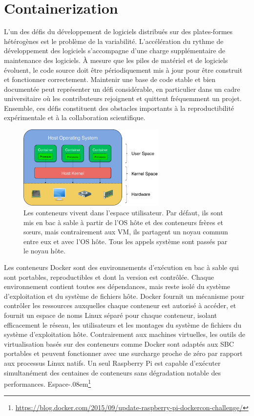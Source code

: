 \section{Containerization}\label{sec:containerization}

L'un des défis du développement de logiciels distribués sur des plates-formes hétérogènes est le problème de la variabilité. L'accélération du rythme de développement des logiciels s'accompagne d'une charge supplémentaire de maintenance des logiciels. À mesure que les piles de matériel et de logiciels évoluent, le code source doit être périodiquement mis à jour pour être construit et fonctionner correctement. Maintenir une base de code stable et bien documentée peut représenter un défi considérable, en particulier dans un cadre universitaire où les contributeurs rejoignent et quittent fréquemment un projet. Ensemble, ces défis constituent des obstacles importants à la reproductibilité expérimentale et à la collaboration scientifique.

\begin{figure}[ht]
\center
\includegraphics[width=0.65\textwidth]{../figures/user_kernel_hardware.png}
\caption{Les conteneurs vivent dans l'espace utilisateur. Par défaut, ils sont mis en bac à sable à partir de l'OS hôte et des conteneurs frères et sœurs, mais contrairement aux VM, ils partagent un noyau commun entre eux et avec l'OS hôte. Tous les appels système sont passés par le noyau hôte.}
\label{fig:user_kernel_hardware}
\end{figure}

Les conteneurs Docker sont des environnements d'exécution en bac à sable qui sont portables, reproductibles et dont la version est contrôlée. Chaque environnement contient toutes ses dépendances, mais reste isolé du système d'exploitation et du système de fichiers hôte. Docker fournit un mécanisme pour contrôler les ressources auxquelles chaque conteneur est autorisé à accéder, et fournit un espace de noms Linux séparé pour chaque conteneur, isolant efficacement le réseau, les utilisateurs et les montages du système de fichiers du système d'exploitation hôte. Contrairement aux machines virtuelles, les outils de virtualisation basés sur des conteneurs comme Docker sont adaptés aux SBC portables et peuvent fonctionner avec une surcharge proche de zéro par rapport aux processus Linux natifs. Un seul Raspberry Pi est capable d'exécuter simultanément des centaines de conteneurs sans dégradation notable des performances. Espace{-.08em}\footnote{\url{https://blog.docker.com/2015/09/update-raspberry-pi-dockercon-challenge/}}

